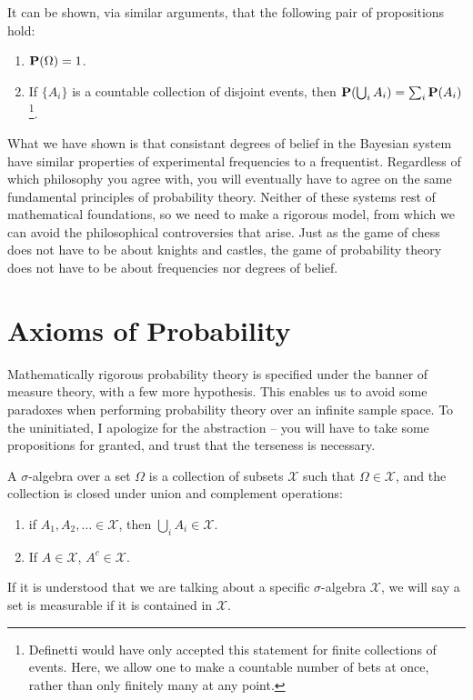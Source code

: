 It can be shown, via similar arguments, that the following pair of propositions hold:
%
\begin{enumerate}
    \item $\operatorname{\mathbf{P}}(\Omega) = 1$.
    \item If $\{ A_i \}$ is a countable collection of disjoint events, then $\operatorname{\mathbf{P}}(\bigcup_i A_i) = \sum_i \operatorname{\mathbf{P}}(A_i)$\footnote{Definetti would have only accepted this statement for finite collections of events. Here, we allow one to make a countable number of bets at once, rather than only finitely many at any point.}.
\end{enumerate}
%
What we have shown is that consistant degrees of belief in the Bayesian system have similar properties of experimental frequencies to a frequentist. Regardless of which philosophy you agree with, you will eventually have to agree on the same fundamental principles of probability theory. Neither of these systems rest of mathematical foundations, so we need to make a rigorous model, from which we can avoid the philosophical controversies that arise. Just as the game of chess does not have to be about knights and castles, the game of probability theory does not have to be about frequencies nor degrees of belief.

\section{Axioms of Probability}

Mathematically rigorous probability theory is specified under the banner of measure theory, with a few more hypothesis. This enables us to avoid some paradoxes when performing probability theory over an infinite sample space. To the uninitiated, I apologize for the abstraction -- you will have to take some propositions for granted, and trust that the terseness is necessary.

\begin{definition}
    A $\sigma$-algebra over a set $\Omega$ is a collection of subsets $\mathcal{X}$ such that $\Omega \in \mathcal{X}$, and the collection is closed under union and complement operations:
    \begin{enumerate}
        \item if $A_1, A_2, \dots \in \mathcal{X}$, then $\bigcup_i A_i \in \mathcal{X}$.
        \item If $A \in \mathcal{X}$, $A^c \in \mathcal{X}$.
    \end{enumerate}
    If it is understood that we are talking about a specific $\sigma$-algebra $\mathcal{X}$, we will say a set is measurable if it is contained in $\mathcal{X}$.
\end{definition}

